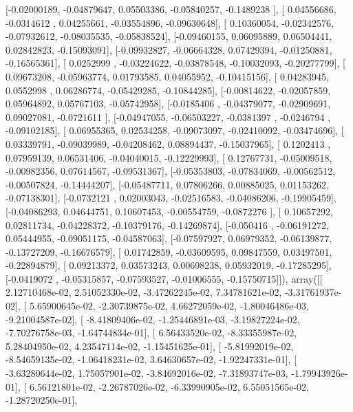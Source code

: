 \documentclass{article}
\begin{document}
       [-0.02000189, -0.04879647,  0.05503386, -0.05840257, -0.1489238 ],
       [ 0.04556686, -0.0314612 ,  0.04255661, -0.03554896, -0.09630648],
       [ 0.10360054, -0.02342576, -0.07932612, -0.08035535, -0.05838524],
       [-0.09460155,  0.06095889,  0.06504441,  0.02842823, -0.15093091],
       [-0.09932827, -0.06664328,  0.07429394, -0.01250881, -0.16565361],
       [ 0.0252999 , -0.03224622, -0.03878548, -0.10032093, -0.20277799],
       [ 0.09673208, -0.05963774,  0.01793585,  0.04055952, -0.10415156],
       [ 0.04283945,  0.0552998 ,  0.06286774, -0.05429285, -0.10844285],
       [-0.00814622, -0.02057859,  0.05964892,  0.05767103, -0.05742958],
       [-0.0185406 , -0.04379077, -0.02909691,  0.09027081, -0.0721611 ],
       [-0.04947055, -0.06503227, -0.0381397 , -0.0246794 , -0.09102185],
       [ 0.06955365,  0.02534258, -0.09073097, -0.02410092, -0.03474696],
       [ 0.03339791, -0.09039989, -0.04208462,  0.08894437, -0.15037965],
       [ 0.1202413 ,  0.07959139,  0.06531406, -0.04040015, -0.12229993],
       [ 0.12767731, -0.05009518, -0.00982356,  0.07614567, -0.09531367],
       [-0.05353803, -0.07834069, -0.00562512, -0.00507824, -0.14444207],
       [-0.05487711,  0.07806266,  0.00885025,  0.01153262, -0.07138301],
       [-0.0732121 ,  0.02003043, -0.02516583, -0.04086206, -0.19905459],
       [-0.04086293,  0.04644751,  0.10607453, -0.00554759, -0.0872276 ],
       [ 0.10657292,  0.02811734, -0.04228372, -0.10379176, -0.14269874],
       [-0.050416  , -0.06191272,  0.05444955, -0.09051175, -0.04587063],
       [-0.07597927,  0.06979352, -0.06139877, -0.13727209, -0.16676579],
       [ 0.01742859, -0.03609595,  0.09847559,  0.03497501, -0.22894879],
       [ 0.09213372,  0.03573243,  0.00698238,  0.05932019, -0.17285295],
       [-0.0419072 , -0.05315857, -0.07593527, -0.01006555, -0.15750715]]), array([[  2.12710468e-02,   2.51052330e-02,  -3.47262245e-02,
          7.34781621e-02,  -3.31761937e-02],
       [  5.65900645e-02,  -2.30739875e-02,   4.66272059e-02,
         -1.80046486e-03,  -9.21004587e-02],
       [ -8.41809406e-02,  -1.25446891e-03,  -3.19827224e-02,
         -7.70276758e-03,  -1.64744834e-01],
       [  6.56433520e-02,  -8.33355987e-02,   5.28404950e-02,
          4.23547114e-02,  -1.15451625e-01],
       [ -5.81992019e-02,  -8.54659135e-02,  -1.06418231e-02,
          3.64630657e-02,  -1.92247331e-01],
       [ -3.63280644e-02,   1.75057901e-02,  -3.84692016e-02,
         -7.31893747e-03,  -1.79943926e-01],
       [  6.56121801e-02,  -2.26787026e-02,  -6.33990905e-02,
          6.55051565e-02,  -1.28720250e-01],
\end{document}
